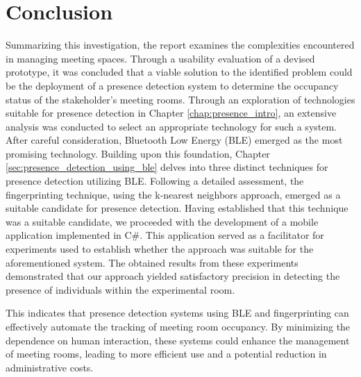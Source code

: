 \chapter{Conclusion}
Summarizing this investigation, the report examines the complexities encountered in managing meeting spaces. 
Through a usability evaluation of a devised prototype, it was concluded that a viable solution to the identified problem could be the deployment of a presence detection system to determine the occupancy status of the stakeholder's meeting rooms.
Through an exploration of technologies suitable for presence detection in Chapter \ref{chap:presence_intro}, an extensive analysis was conducted to select an appropriate technology for such a system.
After careful consideration, Bluetooth Low Energy (BLE) emerged as the most promising technology. 
Building upon this foundation, Chapter \ref{sec:presence_detection_using_ble} delves into three distinct techniques for presence detection utilizing BLE.
Following a detailed assessment, the fingerprinting technique, using the k-nearest neighbors approach, emerged as a suitable candidate for presence detection.
Having established that this technique was a suitable candidate, we proceeded with the development of a mobile application implemented in C#. 
This application served as a facilitator for experiments used to establish whether the approach was suitable for the aforementioned system. 
The obtained results from these experiments demonstrated that our approach yielded satisfactory precision in detecting the presence of individuals within the experimental room.

This indicates that presence detection systems using BLE and fingerprinting can effectively automate the tracking of meeting room occupancy.
By minimizing the dependence on human interaction, these systems could enhance the management of meeting rooms, leading to more efficient use and a potential reduction in administrative costs.